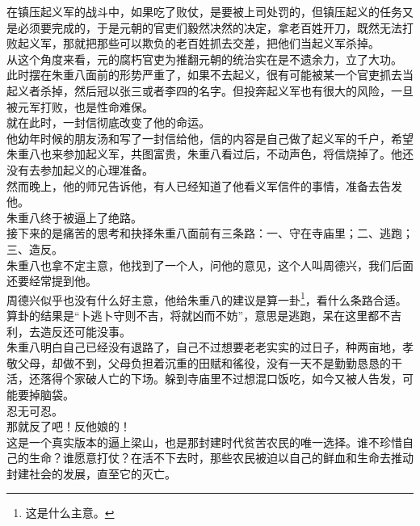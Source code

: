 \begin{multicols}{\theparacolNo}
在镇压起义军的战斗中，如果吃了败仗，是要被上司处罚的，但镇压起义的任务又是必须要完成的，于是元朝的官吏们毅然决然的决定，拿老百姓开刀，既然无法打败起义军，那就把那些可以欺负的老百姓抓去交差，把他们当起义军杀掉。\\

从这个角度来看，元的腐朽官吏为推翻元朝的统治实在是不遗余力，立了大功。\\

此时摆在朱重八面前的形势严重了，如果不去起义，很有可能被某一个官吏抓去当起义者杀掉，然后冠以张三或者李四的名字。但投奔起义军也有很大的风险，一旦被元军打败，也是性命难保。\\

就在此时，一封信彻底改变了他的命运。\\

他幼年时候的朋友汤和写了一封信给他，信的内容是自己做了起义军的千户，希望朱重八也来参加起义军，共图富贵，朱重八看过后，不动声色，将信烧掉了。他还没有去参加起义的心理准备。\\

然而晚上，他的师兄告诉他，有人已经知道了他看义军信件的事情，准备去告发他。\\

朱重八终于被逼上了绝路。\\

接下来的是痛苦的思考和抉择朱重八面前有三条路：一、守在寺庙里；二、逃跑；三、造反。\\

朱重八也拿不定主意，他找到了一个人，问他的意见，这个人叫周德兴，我们后面还要经常提到他。\\

周德兴似乎也没有什么好主意，他给朱重八的建议是算一卦\footnote{这是什么主意。}，看什么条路合适。\\

算卦的结果是“卜逃卜守则不吉，将就凶而不妨”，意思是逃跑，呆在这里都不吉利，去造反还可能没事。\\

朱重八明白自己已经没有退路了，自己不过想要老老实实的过日子，种两亩地，孝敬父母，却做不到，父母负担着沉重的田赋和徭役，没有一天不是勤勤恳恳的干活，还落得个家破人亡的下场。躲到寺庙里不过想混口饭吃，如今又被人告发，可能要掉脑袋。\\

忍无可忍。\\

那就反了吧！反他娘的！\\

这是一个真实版本的逼上梁山，也是那封建时代贫苦农民的唯一选择。谁不珍惜自己的生命？谁愿意打仗？在活不下去时，那些农民被迫以自己的鲜血和生命去推动封建社会的发展，直至它的灭亡。\\


\end{multicols}
